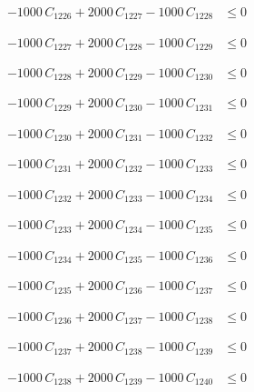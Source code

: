 \documentclass[a4paper,11pt]{article}
\begin{document}
\begin{align}
-1000\,C_{1226} + 2000\,C_{1227} - 1000\,C_{1228} &\leq 0 \nonumber
\end{align}

\begin{align}
-1000\,C_{1227} + 2000\,C_{1228} - 1000\,C_{1229} &\leq 0 \nonumber
\end{align}

\begin{align}
-1000\,C_{1228} + 2000\,C_{1229} - 1000\,C_{1230} &\leq 0 \nonumber
\end{align}

\begin{align}
-1000\,C_{1229} + 2000\,C_{1230} - 1000\,C_{1231} &\leq 0 \nonumber
\end{align}

\begin{align}
-1000\,C_{1230} + 2000\,C_{1231} - 1000\,C_{1232} &\leq 0 \nonumber
\end{align}

\begin{align}
-1000\,C_{1231} + 2000\,C_{1232} - 1000\,C_{1233} &\leq 0 \nonumber
\end{align}

\begin{align}
-1000\,C_{1232} + 2000\,C_{1233} - 1000\,C_{1234} &\leq 0 \nonumber
\end{align}

\begin{align}
-1000\,C_{1233} + 2000\,C_{1234} - 1000\,C_{1235} &\leq 0 \nonumber
\end{align}

\begin{align}
-1000\,C_{1234} + 2000\,C_{1235} - 1000\,C_{1236} &\leq 0 \nonumber
\end{align}

\begin{align}
-1000\,C_{1235} + 2000\,C_{1236} - 1000\,C_{1237} &\leq 0 \nonumber
\end{align}

\begin{align}
-1000\,C_{1236} + 2000\,C_{1237} - 1000\,C_{1238} &\leq 0 \nonumber
\end{align}

\begin{align}
-1000\,C_{1237} + 2000\,C_{1238} - 1000\,C_{1239} &\leq 0 \nonumber
\end{align}

\begin{align}
-1000\,C_{1238} + 2000\,C_{1239} - 1000\,C_{1240} &\leq 0 \nonumber
\end{align}
\end{document}
